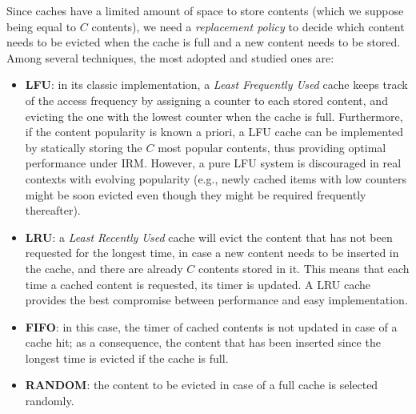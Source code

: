 \documentclass[10pt]{article}
\newcommand{\fakeacmpar}[1]{\vspace{2 mm}\noindent{\textbf{#1.}}}
\begin{document}
\fakeacmpar{Replacement Policy}
Since caches have a limited amount of space to store contents (which we suppose being equal to $C$ contents), we need a \emph{replacement policy} to decide which content needs to be evicted when the cache is full and a new content needs to be stored. 
Among several techniques, the most adopted and studied ones are:
\begin{itemize}
\item \textbf{LFU}: in its classic implementation, a \emph{Least Frequently Used} cache keeps track of the access frequency by assigning a counter to each stored content, and evicting the one with the lowest counter when the cache is full. Furthermore, if the content popularity is known a priori, a LFU cache can be implemented by statically storing the $C$ most popular contents, thus providing optimal performance under IRM. However, a pure LFU system is discouraged in real contexts with evolving popularity (e.g., newly cached items with low counters might be soon evicted even though they might be required frequently thereafter). 
\item \textbf{LRU}: a \emph{Least Recently Used} cache will evict the content that has not been requested for the longest time, in case a new content needs to be inserted in the cache, and there are already $C$ contents stored in it. This means that each time a cached content is requested, its timer is updated. A LRU cache provides the best compromise between performance and easy implementation.   
\item \textbf{FIFO}: in this case, the timer of cached contents is not updated in case of a cache hit; as a consequence, the content that has been inserted since the longest time is evicted if the cache is full.
\item \textbf{RANDOM}: the content to be evicted in case of a full cache is selected randomly.
\end{itemize}
\end{document}
